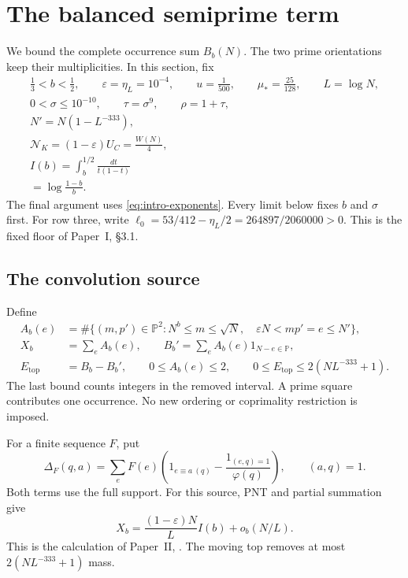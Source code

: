 \section{The balanced semiprime term}\label{sec:k2}

We bound the complete occurrence sum \(B_b(N)\).
The two prime orientations keep their multiplicities.
In this section, fix
\begin{equation}\label{eq:k2-parameters}
\begin{gathered}
 \frac13<b<\frac12,\qquad \varepsilon=\eta_L=10^{-4},\qquad
 u=\frac1{500},\qquad \mu_* =\frac{25}{128},\qquad L=\log N,\\
 0<\sigma\le10^{-10},\qquad \tau=\sigma^9,\qquad \rho=1+\tau,\\
 N'=N(1-L^{-333}),\\
 \mathcal N_K=(1-\varepsilon)U_C=\frac{W(N)}4,\\
 I(b)=\int_b^{1/2}\frac{dt}{t(1-t)}\\
 =\log\frac{1-b}{b}.
\end{gathered}
\end{equation}
The final argument uses \eqref{eq:intro-exponents}.
Every limit below fixes \(b\) and \(\sigma\) first.
For row three, write
\(\ell_0=53/412-\eta_L/2=264897/2060000>0\). This is the fixed floor of
Paper~I, \S3.1.

\subsection{The convolution source}

Define
\begin{equation}\label{eq:k2-source}
\begin{aligned}
 A_b(e)&=\#\{(m,p')\in\mathbb P^2:
 N^b\le m\le\sqrt N,\quad \varepsilon N<mp'=e\le N'\},\\
 X_b&=\sum_e A_b(e),\qquad
 B_b' =\sum_e A_b(e)1_{N-e\in\mathbb P},\\
 E_{\mathrm{top}}&=B_b-B_b',\qquad
 0\le A_b(e)\le2,\qquad
 0\le E_{\mathrm{top}}\le2(NL^{-333}+1).
\end{aligned}
\end{equation}
The last bound counts integers in the removed interval.
A prime square contributes one occurrence.
No new ordering or coprimality restriction is imposed.

For a finite sequence \(F\), put
\begin{equation}\label{eq:k2-natural-kernel}
 \Delta_F(q,a)=\sum_eF(e)
 \left(1_{e\equiv a\ (q)}-\frac{1_{(e,q)=1}}{\varphi(q)}\right),
 \qquad (a,q)=1.
\end{equation}
Both terms use the full support.
For this source, PNT and partial summation give
\begin{equation}\label{eq:k2-source-mass}
 X_b=\frac{(1-\varepsilon)N}{L}I(b)+o_b(N/L).
\end{equation}
This is the calculation of Paper~II,
\cite[(5.44)--(5.51)]{PaperII}.
The moving top removes at most \(2(NL^{-333}+1)\) mass.

